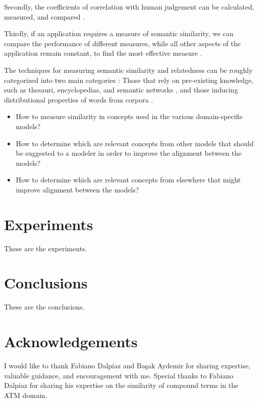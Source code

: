 \documentclass{article}
\begin{document}
Secondly, the coefficients of correlation with human judgement can be calculated, measured, and compared \citep{zhou2008new,seco2004intrinsic}.

Thirdly, if an application requires a measure of semantic similarity, we can compare the performance of different measures, while all other aspects of the application remain constant, to find the most effective measure \citep{blanchard2006tree,budanitsky2006evaluating}. %

The techniques for measuring semantic similarity and relatedness can be roughly categorized into two main categories \citep{agirre2009study}: Those that rely on pre-existing knowledge, such as thesauri, encyclopedias, and semantic networks \citep{alvarez2007graph,yang2005measuring,hughes2007lexical}, and those inducing distributional properties of words from corpora \citep{sahami2006web,chen2006novel,bollegala2007measuring}.


\begin{itemize}
	\item How to measure similarity in concepts used in the various domain-specific models?
	\item How to determine which are relevant concepts from other models that should be suggested to a modeler in order to improve the alignment between the models?
	\item How to determine which are relevant concepts from elsewhere that might improve alignment between the models?
\end{itemize}

\section{Experiments} \label{sec:experiments}

These are the experiments.

\section{Conclusions} \label{sec:conclusions}

These are the conclusions.

\section{Acknowledgements} \label{sec:ack}

I would like to thank Fabiano Dalpiaz and Ba\c sak Aydemir for sharing expertise, valuable guidance, and encouragement with me. Special thanks to Fabiano Dalpiaz for sharing his expertise on the similarity of compound terms in the ATM domain.

\printbibliography
\end{document}
